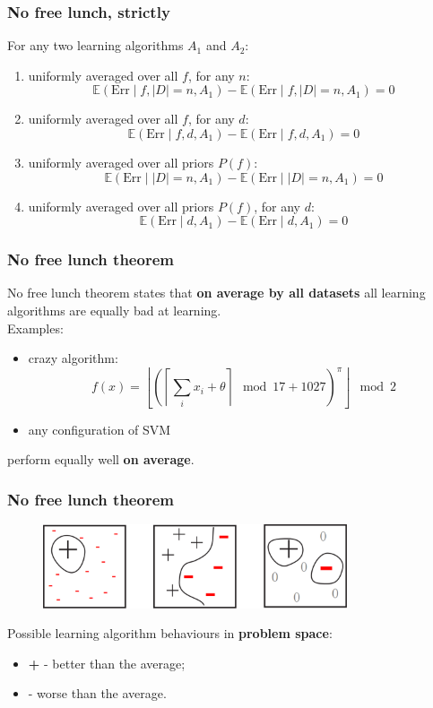 \documentclass[mathserif, aspectratio=43]{beamer}
\begin{document}
\begin{frame}[fragile]
\frametitle{No free lunch, strictly}
For any two learning algorithms $A_1$ and $A_2$:
\begin{enumerate}
\item uniformly averaged over all $f$, for any $n$:
$$\mathbb{E}(\mathrm{Err} \mid f, |D| = n, A_1) - \mathbb{E}(\mathrm{Err} \mid f, |D| = n, A_1) = 0$$
\item uniformly averaged over all $f$, for any $d$:
$$\mathbb{E}(\mathrm{Err} \mid f, d, A_1) - \mathbb{E}(\mathrm{Err} \mid f, d, A_1) = 0$$
\item uniformly averaged over all priors $P(f)$:
$$\mathbb{E}(\mathrm{Err} \mid |D| = n, A_1) - \mathbb{E}(\mathrm{Err} \mid |D| = n, A_1) = 0$$
\item uniformly averaged over all priors $P(f)$, for any $d$:
$$\mathbb{E}(\mathrm{Err} \mid d, A_1) - \mathbb{E}(\mathrm{Err} \mid d, A_1) = 0$$
\end{enumerate}

\end{frame}


\begin{frame}[fragile]
\frametitle{No free lunch theorem}
No free lunch theorem states that \textbf{on average by all datasets}
all learning algorithms are equally bad at learning.\\
Examples:
\begin{itemize}
\item crazy algorithm:
$$f(x) = \left\lfloor \left( \left\lceil \sum_i x_i + \theta \right\rceil \mod 17 + 1027 \right)^\pi \right\rfloor \mod 2$$
\item any configuration of SVM
\end{itemize}
perform equally well \textbf{on average}.

\end{frame}


\begin{frame}[fragile]
\frametitle{No free lunch theorem}
\begin{figure}
\centering
\includegraphics[width=0.8\textwidth]{imgs/no-free-lunch.png}
\end{figure}
Possible learning algorithm behaviours in \textbf{problem space}:
\begin{itemize}
\item \textbf{+} - better than the average;
\item {\color{red} \textbf{\textemdash}} - worse than the average.
\end{itemize}

\end{frame}
\end{document}
